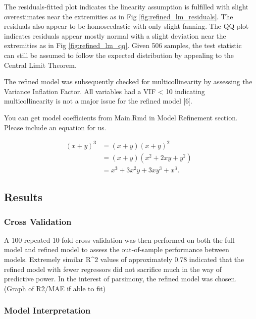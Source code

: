\documentclass[letterpaper,10pt,twocolumn,twoside,]{pinp}
\begin{document}
The residuals-fitted plot indicates the linearity assumption is
fulfilled with slight overestimates near the extremities as in Fig
\ref{fig:refined_lm_residuals}. The residuals also appear to be
homoscedastic with only slight fanning. The QQ-plot indicates residuals
appear mostly normal with a slight deviation near the extremities as in
Fig \ref{fig:refined_lm_qq}. Given 506 samples, the test statistic can
still be assumed to follow the expected distribution by appealing to the
Central Limit Theorem.

The refined model was subsequently checked for multicollinearity by
assessing the Variance Inflation Factor. All variables had a VIF
\textless{} 10 indicating multicollinearity is not a major issue for the
refined model {[}6{]}.

You can get model coefficients from Main.Rmd in Model Refinement
section. Please include an equation for us.

\begin{equation}
  \begin{aligned}
(x+y)^3&=(x+y)(x+y)^2\\
       &=(x+y)(x^2+2xy+y^2) \\
       &=x^3+3x^2y+3xy^3+x^3. 
       \label{eqn:example} 
  \end{aligned}
\end{equation}

\hypertarget{results}{%
\subsection{Results}\label{results}}

\hypertarget{cross-validation}{%
\subsubsection{Cross Validation}\label{cross-validation}}

A 100-repeated 10-fold cross-validation was then performed on both the
full model and refined model to assess the out-of-sample performance
between models. Extremely similar R\^{}2 values of approximately 0.78
indicated that the refined model with fewer regressors did not sacrifice
much in the way of predictive power. In the interest of parsimony, the
refined model was chosen. (Graph of R2/MAE if able to fit)

\hypertarget{model-interpretation}{%
\subsubsection{Model Interpretation}\label{model-interpretation}}
\end{document}
